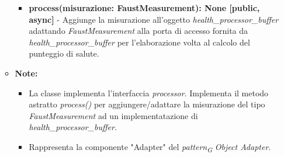\begin{itemize}
\begin{itemize}
    \begin{itemize}
        \item \textbf{process(misurazione: FaustMeasurement): None [public, async]} - Aggiunge la misurazione all'oggetto \textit{health\_processor\_buffer} adattando \textit{FaustMeasurement} alla porta di accesso fornita da \textit{health\_processor\_buffer} per l'elaborazione volta al calcolo del punteggio di salute.
    \end{itemize}
    \item\textbf{Note:}
        \begin{itemize}
            \item La classe implementa l'interfaccia \textit{processor}. Implementa il metodo astratto \textit{process()} per aggiungere/adattare la misurazione del tipo \textit{FaustMeasurement} ad un implementatazione di \textit{health\_processor\_buffer}.
            \item Rappresenta la componente "Adapter" del \textit{pattern}\textsubscript{\textit{G}} \textit{Object Adapter}.
        \end{itemize}
    \end{itemize}
\end{itemize}